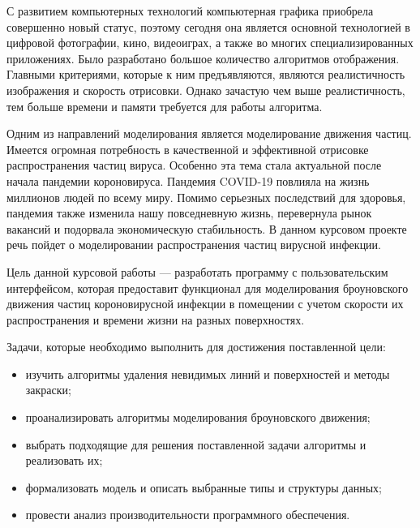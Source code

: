 \Introduction

С развитием компьютерных технологий компьютерная графика приобрела совершенно новый статус, поэтому сегодня она является основной технологией в цифровой фотографии, кино, видеоиграх, а также во многих специализированных приложениях. Было разработано большое количество алгоритмов отображения. Главными критериями, которые к ним предъявляются, являются реалистичность изображения и скорость отрисовки. Однако зачастую чем выше реалистичность, тем больше времени и памяти требуется для работы алгоритма.

Одним из направлений моделирования является моделирование движения частиц. Имеется огромная потребность в качественной и эффективной отрисовке распространения частиц вируса. Особенно эта тема стала актуальной после начала пандемии короновируса. Пандемия COVID-19 повлияла на жизнь миллионов людей по всему миру. Помимо серьезных последствий для здоровья, пандемия также изменила нашу повседневную жизнь, перевернула рынок вакансий и подорвала экономическую стабильность. В данном курсовом проекте речь пойдет о моделировании распространения частиц вирусной инфекции.

Цель данной курсовой работы --- разработать программу с пользовательским интерфейсом, которая предоставит функционал для моделирования броуновского движения частиц короновирусной инфекции в помещении с учетом скорости их распространения и времени жизни на разных поверхностях.

Задачи, которые необходимо выполнить для достижения поставленной цели:

\begin{itemize}
	\item изучить алгоритмы удаления невидимых линий и поверхностей и методы закраски;
	\item проанализировать алгоритмы моделирования броуновского движения;
	\item выбрать подходящие для решения поставленной задачи алгоритмы и реализовать их;
	\item формализовать модель и описать выбранные типы и структуры данных;
	\item провести анализ производительности программного обеспечения.
\end{itemize}